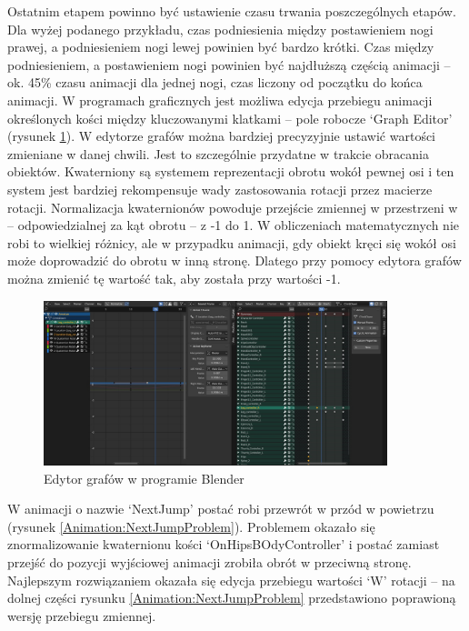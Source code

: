 \documentclass[12pt,twoside]{article}
\begin{document}
Ostatnim etapem powinno być ustawienie czasu trwania poszczególnych etapów. Dla wyżej
podanego przykładu, czas podniesienia między postawieniem nogi prawej, a
podniesieniem nogi lewej powinien być bardzo krótki. Czas między podniesieniem,
a postawieniem nogi powinien być najdłuższą częścią animacji -- ok. 45\% czasu
animacji dla jednej nogi, czas liczony od początku do końca animacji. W
programach graficznych jest możliwa edycja przebiegu animacji określonych kości
między kluczowanymi klatkami -- pole robocze `Graph Editor' (rysunek
\ref{Animation:GraphEditor}). W edytorze grafów można bardziej precyzyjnie
ustawić wartości zmieniane w danej chwili. Jest to szczególnie przydatne w
trakcie obracania obiektów. Kwaterniony są systemem reprezentacji obrotu wokół
pewnej osi i ten system jest bardziej rekompensuje wady zastosowania rotacji
przez macierze rotacji. Normalizacja kwaternionów powoduje przejście zmiennej w
przestrzeni w -- odpowiedzialnej za kąt obrotu -- z -1 do 1. W obliczeniach
matematycznych nie robi to wielkiej różnicy, ale w przypadku animacji, gdy
obiekt kręci się wokół osi może doprowadzić do obrotu w inną stronę. Dlatego
przy pomocy edytora grafów można zmienić tę wartość tak, aby została przy
wartości -1. 
\begin{figure}[!h]
    \centering
	\includegraphics[width=10cm]{RealizacjaProjektu/MC/Animation_Graph_Editor.jpg}
	\caption{Edytor grafów w programie Blender}
    \label{Animation:GraphEditor}
\end{figure}
\linebreak
\linebreak
W animacji o nazwie `NextJump' postać robi przewrót w przód w powietrzu (rysunek
\ref{Animation:NextJumpProblem}). Problemem okazało się znormalizowanie
kwaternionu kości `OnHipsBOdyController' i postać zamiast przejść do pozycji
wyjściowej animacji zrobiła obrót w przeciwną stronę. Najlepszym rozwiązaniem
okazała się edycja przebiegu wartości `W' rotacji -- na dolnej części rysunku
\ref{Animation:NextJumpProblem} przedstawiono poprawioną wersję przebiegu
zmiennej. 
\end{document}
